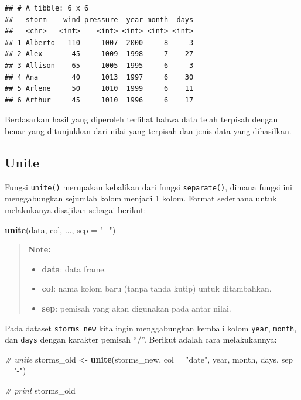 \documentclass[]{book}
\newenvironment{Shaded}{\begin{snugshade}}{\end{snugshade}}
\newcommand{\KeywordTok}[1]{\textcolor[rgb]{0.13,0.29,0.53}{\textbf{#1}}}
\newcommand{\DataTypeTok}[1]{\textcolor[rgb]{0.13,0.29,0.53}{#1}}
\newcommand{\StringTok}[1]{\textcolor[rgb]{0.31,0.60,0.02}{#1}}
\newcommand{\CommentTok}[1]{\textcolor[rgb]{0.56,0.35,0.01}{\textit{#1}}}
\newcommand{\NormalTok}[1]{#1}
\providecommand{\tightlist}{%
  \setlength{\itemsep}{0pt}\setlength{\parskip}{0pt}}
\begin{document}
\begin{verbatim}
## # A tibble: 6 x 6
##   storm    wind pressure  year month  days
##   <chr>   <int>    <int> <int> <int> <int>
## 1 Alberto   110     1007  2000     8     3
## 2 Alex       45     1009  1998     7    27
## 3 Allison    65     1005  1995     6     3
## 4 Ana        40     1013  1997     6    30
## 5 Arlene     50     1010  1999     6    11
## 6 Arthur     45     1010  1996     6    17
\end{verbatim}

Berdasarkan hasil yang diperoleh terlihat bahwa data telah terpisah
dengan benar yang ditunjukkan dari nilai yang terpisah dan jenis data
yang dihasilkan.

\subsection{Unite}\label{unite}

Fungsi \texttt{unite()} merupakan kebalikan dari fungsi
\texttt{separate()}, dimana fungsi ini menggabungkan sejumlah kolom
menjadi 1 kolom. Format sederhana untuk melakukanya disajikan sebagai
berikut:

\begin{Shaded}
\begin{Highlighting}[]
\KeywordTok{unite}\NormalTok{(data, col, ..., }\DataTypeTok{sep =} \StringTok{"_"}\NormalTok{)}
\end{Highlighting}
\end{Shaded}

\begin{quote}
\textbf{Note: }

\begin{itemize}
\tightlist
\item
  \textbf{data}: data frame.
\item
  \textbf{col}: nama kolom baru (tanpa tanda kutip) untuk ditambahkan.
\item
  \textbf{sep}: pemisah yang akan digunakan pada antar nilai.
\end{itemize}
\end{quote}

Pada dataset \texttt{storms\_new} kita ingin menggabungkan kembali kolom
\texttt{year}, \texttt{month}, dan \texttt{days} dengan karakter pemisah
``/''. Berikut adalah cara melakukannya:

\begin{Shaded}
\begin{Highlighting}[]
\CommentTok{# unite}
\NormalTok{storms_old <-}\StringTok{ }\KeywordTok{unite}\NormalTok{(storms_new,}
                   \DataTypeTok{col =} \StringTok{"date"}\NormalTok{,}
\NormalTok{                   year, month, days,}
                   \DataTypeTok{sep =} \StringTok{"-"}\NormalTok{)}

\CommentTok{# print}
\NormalTok{storms_old}
\end{Highlighting}
\end{Shaded}
\end{document}
